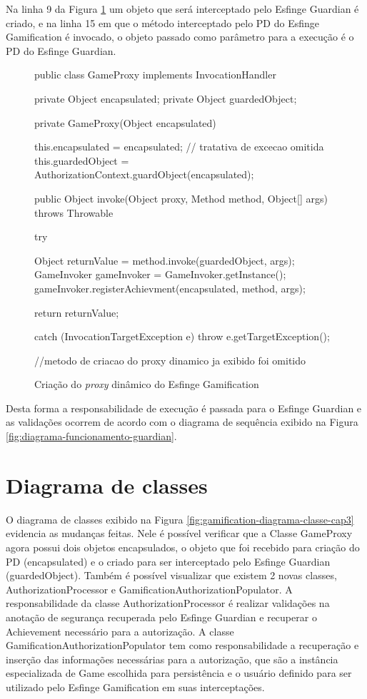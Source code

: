 \par Na linha 9 da Figura \ref{fig:esfinge-proxy} um objeto que será interceptado pelo Esfinge Guardian é criado, e na linha 15 em que o método interceptado pelo PD do Esfinge Gamification é invocado, o objeto passado como parâmetro para a execução é o PD do Esfinge Guardian.

\begin{figure}[H]
    \centering
    \caption{Criação do \textit{proxy} dinâmico do Esfinge Gamification}
    \begin{java}
public class GameProxy implements InvocationHandler {

    private Object encapsulated;
	private Object guardedObject; 
    
    private GameProxy(Object encapsulated) {
        this.encapsulated = encapsulated;
    	// tratativa de excecao omitida
    	this.guardedObject = AuthorizationContext.guardObject(encapsulated);
    	
    }

    public Object invoke(Object proxy, Method method, Object[] args) throws Throwable {
    	try {
        	Object returnValue = method.invoke(guardedObject, args);
        	GameInvoker gameInvoker = GameInvoker.getInstance();
        	gameInvoker.registerAchievment(encapsulated, method, args);
    
    	    return returnValue;
    	} catch (InvocationTargetException e) {
    	    throw e.getTargetException();
    	}
    }
    //metodo de criacao do proxy dinamico ja exibido foi omitido
}
    \end{java}
    \label{fig:esfinge-proxy}
\end{figure}

\par Desta forma a responsabilidade de execução é passada para o Esfinge Guardian e as validações ocorrem de acordo com o diagrama de sequência exibido na Figura \ref{fig:diagrama-funcionamento-guardian}.

\section{Diagrama de classes}

\par O diagrama de classes exibido na Figura \ref{fig:gamification-diagrama-classe-cap3} evidencia as mudanças feitas. Nele é possível verificar que a Classe GameProxy agora possui dois objetos encapsulados, o objeto que foi recebido para criação do PD (encapsulated) e o criado para ser interceptado pelo Esfinge Guardian (guardedObject). Também é possível visualizar que existem 2 novas classes, AuthorizationProcessor e GamificationAuthorizationPopulator. A responsabilidade da classe AuthorizationProcessor é realizar validações na anotação de segurança recuperada pelo Esfinge Guardian e recuperar o Achievement necessário para a autorização. A classe GamificationAuthorizationPopulator tem como responsabilidade a recuperação e inserção das informações necessárias para a autorização, que são a instância especializada de Game escolhida para persistência e o usuário definido para ser utilizado pelo Esfinge Gamification em suas interceptações.

